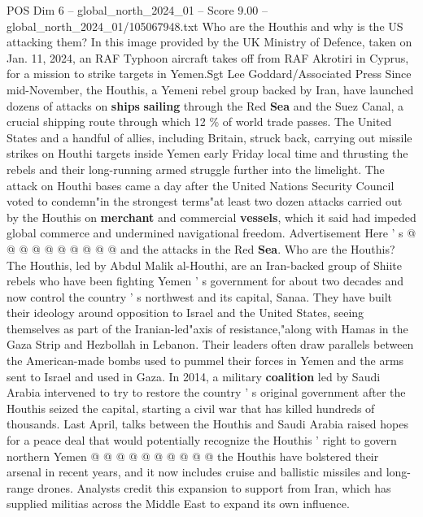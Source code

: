 \begin{textsample}{POS Dim 6 – global\_north\_2024\_01 – Score 9.00 – global\_north\_2024\_01/105067948.txt}  \label{ex:f6_pos_097}
Who are the Houthis and why is the US attacking them?
In this image provided by the UK Ministry of Defence, taken on Jan. 11, 2024, an RAF Typhoon aircraft takes off from RAF Akrotiri in Cyprus, for a mission to strike targets in Yemen.Sgt Lee Goddard/Associated Press Since mid-November, the Houthis, a Yemeni rebel group backed by Iran, have launched dozens of attacks on \textbf{ships} \textbf{sailing} through the Red \textbf{Sea} and the Suez Canal, a crucial shipping route through which 12 \% of world trade passes.
The United States and a handful of allies, including Britain, struck back, carrying out missile strikes on Houthi targets inside Yemen early Friday local time and thrusting the rebels and their long-running armed struggle further into the limelight.
The attack on Houthi bases came a day after the United Nations Security Council voted to condemn"in the strongest terms"at least two dozen attacks carried out by the Houthis on \textbf{merchant} and commercial \textbf{vessels}, which it said had impeded global commerce and undermined navigational freedom.
Advertisement Here ' s @ @ @ @ @ @ @ @ @ @ and the attacks in the Red \textbf{Sea}.
Who are the Houthis?
The Houthis, led by Abdul Malik al-Houthi, are an Iran-backed group of Shiite rebels who have been fighting Yemen ' s government for about two decades and now control the country ' s northwest and its capital, Sanaa.
They have built their ideology around opposition to Israel and the United States, seeing themselves as part of the Iranian-led"axis of resistance,"along with Hamas in the Gaza Strip and Hezbollah in Lebanon.
Their leaders often draw parallels between the American-made bombs used to pummel their forces in Yemen and the arms sent to Israel and used in Gaza.
In 2014, a military \textbf{coalition} led by Saudi Arabia intervened to try to restore the country ' s original government after the Houthis seized the capital, starting a civil war that has killed hundreds of thousands.
Last April, talks between the Houthis and Saudi Arabia raised hopes for a peace deal that would potentially recognize the Houthis ' right to govern northern Yemen @ @ @ @ @ @ @ @ @ @ the Houthis have bolstered their arsenal in recent years, and it now includes cruise and ballistic missiles and long-range drones.
Analysts credit this expansion to support from Iran, which has supplied militias across the Middle East to expand its own influence.

\end{textsample}
